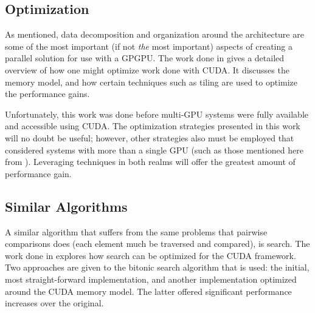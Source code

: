 \documentclass[smallextended]{svjour3}       %
\begin{document}

\subsection{Optimization}
\label{subsec:opti}
As mentioned, data decomposition and organization around the architecture are
some of the most important (if not \emph{the} most important) aspects of
creating a parallel solution for use with a GPGPU. The work done in
\cite{ryoo2008optimization} gives a detailed overview of how one might optimize
work done with CUDA. It discusses the memory model, and how certain techniques
such as tiling are used to optimize the performance gains.

Unfortunately, this work was done before multi-GPU systems were fully available
and accessible using CUDA. The optimization strategies presented in this work
will no doubt be useful; however, other strategies also must be employed that
considered systems with more than a single GPU (such as those mentioned here
from \cite{thibault2009cuda}). Leveraging techniques in both realms will offer
the greatest amount of performance gain.

\subsection{Similar Algorithms}
\label{subsec:simialg}
A similar algorithm that suffers from the same problems that pairwise
comparisons does (each element much be traversed and compared), is search. The
work done in \cite{peters2011fast} explores how search can be optimized for the
CUDA framework. Two approaches are given to the bitonic search algorithm that
is used: the initial, most straight-forward implementation, and another
implementation optimized around the CUDA memory model. The latter offered
significant performance increases over the original. 
\end{document}
